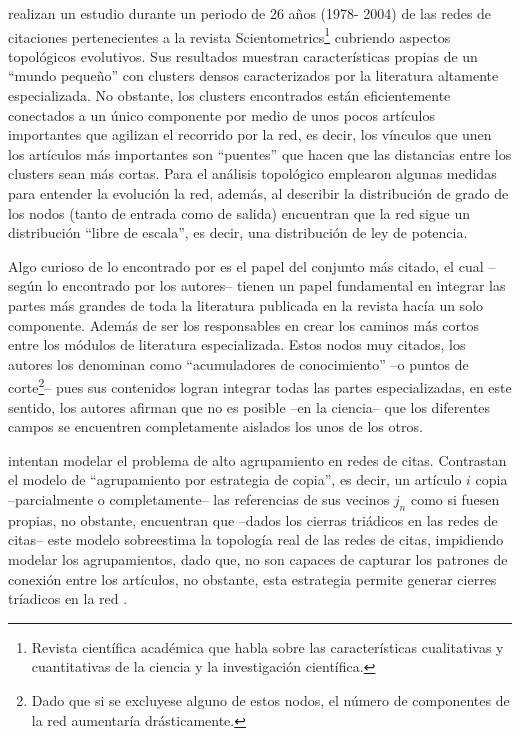 \documentclass[12pt,letter]{article}
\begin{document}
\cite{Li-Chun} realizan un estudio durante un periodo de 26 años (1978- 2004) de las redes de citaciones pertenecientes a la revista Scientometrics\footnote{Revista científica académica que habla sobre las características cualitativas y cuantitativas de la ciencia y la investigación científica.} cubriendo aspectos topológicos evolutivos. Sus resultados muestran características propias de un ``mundo pequeño'' con clusters densos caracterizados por la literatura altamente especializada. No obstante, los clusters encontrados están eficientemente conectados a un único componente por medio de unos pocos artículos importantes que agilizan el recorrido por la red, es decir, los vínculos que unen los artículos más importantes son ``puentes'' que hacen que las distancias entre los clusters sean más cortas. Para el análisis topológico emplearon algunas medidas para entender la evolución la red, además, al describir la distribución de grado de los nodos (tanto de entrada como de salida) encuentran que la red sigue un distribución ``libre de escala'', es decir, una distribución de ley de potencia.

\vspace{0.5cm}

Algo curioso de lo encontrado por \cite{Li-Chun} es el papel del conjunto más citado, el cual --según lo encontrado por los autores-- tienen un papel fundamental en integrar las partes más grandes de toda la literatura publicada en la revista hacía un solo componente. Además de ser los responsables en crear los caminos más cortos entre los módulos de literatura especializada. Estos nodos muy citados, los autores los denominan como ``acumuladores de conocimiento'' --o puntos de corte\footnote{Dado que si se excluyese alguno de estos nodos, el número de componentes de la red aumentaría drásticamente.}-- pues sus contenidos logran integrar todas las partes especializadas, en este sentido, los autores afirman que no es posible --en la ciencia-- que los diferentes campos se encuentren completamente aislados los unos de los otros.

\vspace{0.5cm}

\cite{Ren} intentan modelar el problema de alto agrupamiento en redes de citas. Contrastan el modelo de ``agrupamiento por estrategia de copia'', es decir, un artículo $i$ copia --parcialmente o completamente-- las referencias de sus vecinos $j_{n}$ como si fuesen propias, no obstante, encuentran que --dados los cierras triádicos en las redes de citas-- este modelo sobreestima la topología real de las redes de citas, impidiendo modelar los agrupamientos, dado que, no son capaces de capturar los patrones de conexión entre los artículos, no obstante, esta estrategia permite generar cierres tríadicos en la red \citep{Leskovec3}.
\end{document}
